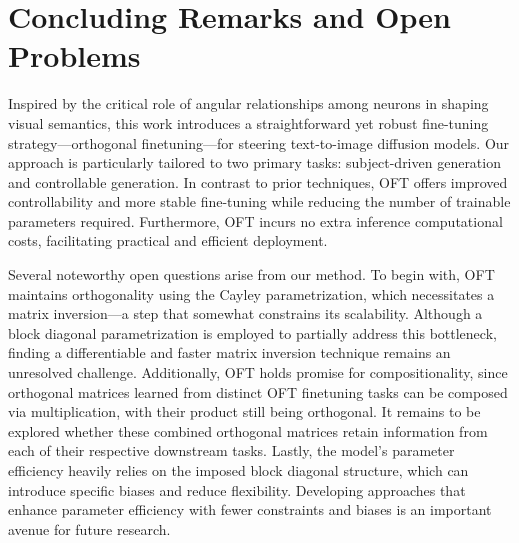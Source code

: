 \section{Concluding Remarks and Open Problems}

Inspired by the critical role of angular relationships among neurons in shaping visual semantics, this work introduces a straightforward yet robust fine-tuning strategy—orthogonal finetuning—for steering text-to-image diffusion models. Our approach is particularly tailored to two primary tasks: subject-driven generation and controllable generation. In contrast to prior techniques, OFT offers improved controllability and more stable fine-tuning while reducing the number of trainable parameters required. Furthermore, OFT incurs no extra inference computational costs, facilitating practical and efficient deployment.

Several noteworthy open questions arise from our method. To begin with, OFT maintains orthogonality using the Cayley parametrization, which necessitates a matrix inversion—a step that somewhat constrains its scalability. Although a block diagonal parametrization is employed to partially address this bottleneck, finding a differentiable and faster matrix inversion technique remains an unresolved challenge. Additionally, OFT holds promise for compositionality, since orthogonal matrices learned from distinct OFT finetuning tasks can be composed via multiplication, with their product still being orthogonal. It remains to be explored whether these combined orthogonal matrices retain information from each of their respective downstream tasks. Lastly, the model’s parameter efficiency heavily relies on the imposed block diagonal structure, which can introduce specific biases and reduce flexibility. Developing approaches that enhance parameter efficiency with fewer constraints and biases is an important avenue for future research.

